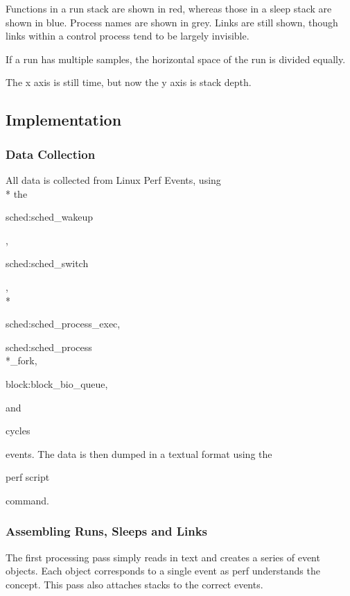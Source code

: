 \documentclass[10pt]{article}
\begin{document}
Functions in a run stack are shown in red, whereas those in a sleep stack are shown in blue.  Process names are shown in grey.  Links are still shown, though links within a control process tend to be largely invisible.

If a run has multiple samples, the horizontal space of the run is divided equally.

The x axis is still time, but now the y axis is stack depth.

\subsection{Implementation}
\subsubsection{Data Collection}


All data is collected from Linux Perf Events, using \\* the \begin{tt}sched:sched\_wakeup\end{tt}, \begin{tt}sched:sched\_switch\end{tt}, \\* \begin{tt}sched:sched\_process\_exec,\end{tt} \begin{tt}sched:sched\_process\\*\_fork,\end{tt} \begin{tt}block:block\_bio\_queue,\end{tt} and \begin{tt}cycles\end{tt} events.  The data is then dumped in a textual format using the \begin{tt}perf script\end{tt} command.


\subsubsection{Assembling Runs, Sleeps and Links}

The first processing pass simply reads in text and creates a series of event objects.  Each object corresponds to a single event as perf understands the concept.  This pass also attaches stacks to the correct events.
\end{document}
